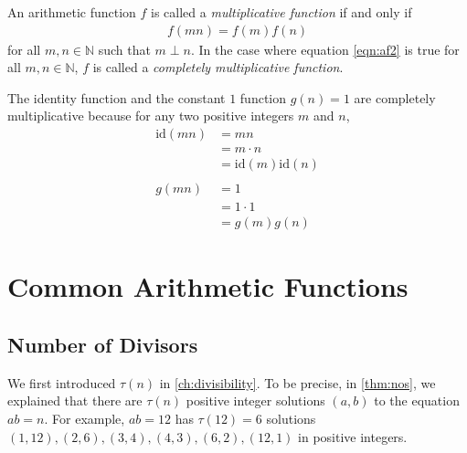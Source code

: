 	\begin{definition}
		An arithmetic function $f$ is called a \textit{multiplicative function} if and only if
			\begin{align}
			f(mn)=f(m)f(n)\label{eqn:af2}
			\end{align}
		for all $m,n\in\mathbb{N}$ such that $m\perp n$. In the case where equation \ref{eqn:af2} is true for all $m,n\in\mathbb{N}$, $f$ is called a \textit{completely multiplicative function}.
	\end{definition}

	\begin{example}
		The identity function and the constant $1$ function $g(n)=1$ are completely multiplicative because for any two positive integers $m$ and $n$,
			\begin{align*}
				\text{id}(mn) &= mn \\
					  &= m \cdot n\\
					  &= \text{id}(m) \text{id}(n)\\
					  \\
						g(mn) &= 1\\
					  &= 1 \cdot 1\\
					  &= g(m)g(n)
			\end{align*}
	\end{example}






\section{Common Arithmetic Functions}
\subsection{Number of Divisors}\label{sec:number-of-divisors}
	We first introduced $\tau(n)$ in \autoref{ch:divisibility}. To be precise, in \autoref{thm:nos}, we explained that there are $\tau(n)$ positive integer solutions $(a,b)$ to the equation $ab=n$. For example, $ab=12$ has $\tau(12)=6$ solutions $(1,12), (2, 6), (3,4), (4,3), (6,2), (12,1)$ in positive integers.

